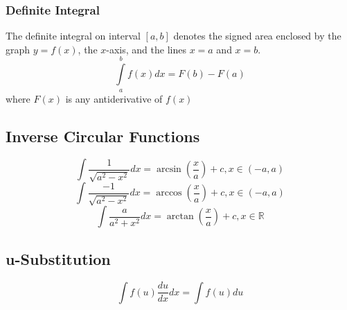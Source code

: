 \documentclass[a4paper,twoside]{article}
\begin{document}
			\subsubsection{Definite Integral}
				The definite integral on interval $[a,b]$ denotes the signed area enclosed by the graph $y=f(x)$, the $x$-axis, and the lines $x=a$ and $x=b$.
				\[
					\int\limits_{a}^{b}f(x)dx=F(b)-F(a)
				\]
				where $F(x)$ is any antiderivative of $f(x)$
		\subsection{Inverse Circular Functions}
			\[
				\int\frac{1}{\sqrt{a^2-x^2}}dx=\arcsin\left(\frac{x}{a}\right)+c,x\in(-a,a)
			\]
			\[
				\int\frac{-1}{\sqrt{a^2-x^2}}dx=\arccos\left(\frac{x}{a}\right)+c,x\in(-a,a)
			\]
			\[
				\int\frac{a}{a^2+x^2}dx=\arctan\left(\frac{x}{a}\right)+c,x\in\mathbb{R}
			\]
		\subsection{u-Substitution}
			\[
				\int f(u)\frac{du}{dx}dx=\int f(u)du
			\]
\end{document}
